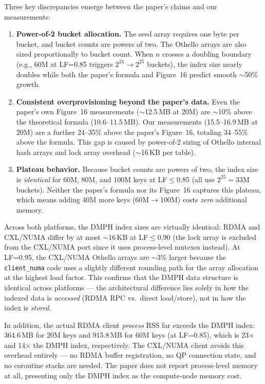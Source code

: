 \documentclass[conference]{IEEEtran}
\begin{document}
Three key discrepancies emerge between the paper's claims and our measurements:
\begin{enumerate}[nosep]
  \item \textbf{Power-of-2 bucket allocation.} The seed array requires one byte per bucket, and bucket counts are powers of two. The Othello arrays are also sized proportionally to bucket count. When $n$ crosses a doubling boundary (e.g., 60M at LF=0.85 triggers $2^{24} \to 2^{25}$ buckets), the index size nearly doubles while both the paper's formula and Figure~16 predict smooth $\sim$50\% growth.
  \item \textbf{Consistent overprovisioning beyond the paper's data.} Even the paper's own Figure~16 measurements ($\sim$12.5\,MB at 20M) are $\sim$10\% above the theoretical formula (10.6--11.5\,MB). Our measurements (15.5--16.9\,MB at 20M) are a further 24--35\% above the paper's Figure~16, totaling 34--55\% above the formula. This gap is caused by power-of-2 sizing of Othello internal hash arrays and lock array overhead ($\sim$16\,KB per table).
  \item \textbf{Plateau behavior.} Because bucket counts are powers of two, the index size is \emph{identical} for 60M, 80M, and 100M keys at LF$\leq$0.85 (all use $2^{25}=33$M buckets). Neither the paper's formula nor its Figure~16 captures this plateau, which means adding 40M more keys (60M$\to$100M) costs \emph{zero} additional memory.
\end{enumerate}

Across both platforms, the DMPH index sizes are virtually identical: RDMA and CXL/NUMA differ by at most $\sim$16\,KB at LF$\leq$0.90 (the lock array is excluded from the CXL/NUMA port since it uses process-level mutexes instead). At LF=0.95, the CXL/NUMA Othello arrays are $\sim$3\% larger because the \texttt{client\_numa} code uses a slightly different rounding path for the array allocation at the highest load factor. This confirms that the DMPH data structure is identical across platforms --- the architectural difference lies solely in how the indexed data is \emph{accessed} (RDMA RPC vs.\ direct load/store), not in how the index is \emph{stored}.

In addition, the actual RDMA client \emph{process} RSS far exceeds the DMPH index: 364.6\,MB for 20M keys and 915.8\,MB for 60M keys (at LF=0.85), which is 23$\times$ and 14$\times$ the DMPH index, respectively. The CXL/NUMA client avoids this overhead entirely --- no RDMA buffer registration, no QP connection state, and no coroutine stacks are needed. The paper does not report process-level memory at all, presenting only the DMPH index as the compute-node memory cost.
\end{document}

